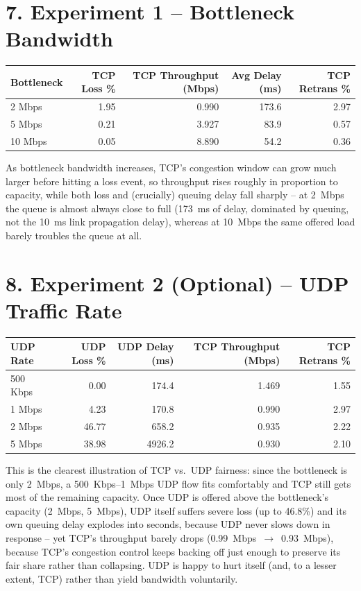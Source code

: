 \documentclass[11pt]{article}
\begin{document}
\section*{7. Experiment 1 -- Bottleneck Bandwidth}
\begin{center}
\renewcommand{\arraystretch}{1.2}
\begin{tabular}{lrrrr}
\toprule
\textbf{Bottleneck} & \textbf{TCP Loss \%} & \textbf{TCP Throughput (Mbps)} & \textbf{Avg Delay (ms)} & \textbf{TCP Retrans \%} \\
\midrule
2 Mbps  & 1.95 & 0.990 & 173.6 & 2.97 \\
5 Mbps  & 0.21 & 3.927 & 83.9  & 0.57 \\
10 Mbps & 0.05 & 8.890 & 54.2  & 0.36 \\
\bottomrule
\end{tabular}
\end{center}
As bottleneck bandwidth increases, TCP's congestion window can grow much
larger before hitting a loss event, so throughput rises roughly in
proportion to capacity, while both loss and (crucially) queuing delay fall
sharply -- at 2~Mbps the queue is almost always close to full (173~ms of
delay, dominated by queuing, not the 10~ms link propagation delay), whereas
at 10~Mbps the same offered load barely troubles the queue at all.

\section*{8. Experiment 2 (Optional) -- UDP Traffic Rate}
\begin{center}
\renewcommand{\arraystretch}{1.2}
\begin{tabular}{lrrrr}
\toprule
\textbf{UDP Rate} & \textbf{UDP Loss \%} & \textbf{UDP Delay (ms)} & \textbf{TCP Throughput (Mbps)} & \textbf{TCP Retrans \%} \\
\midrule
500 Kbps & 0.00  & 174.4  & 1.469 & 1.55 \\
1 Mbps   & 4.23  & 170.8  & 0.990 & 2.97 \\
2 Mbps   & 46.77 & 658.2  & 0.935 & 2.22 \\
5 Mbps   & 38.98 & 4926.2 & 0.930 & 2.10 \\
\bottomrule
\end{tabular}
\end{center}
This is the clearest illustration of TCP vs.\ UDP fairness: since the
bottleneck is only 2~Mbps, a 500~Kbps--1~Mbps UDP flow fits comfortably and
TCP still gets most of the remaining capacity. Once UDP is offered above the
bottleneck's capacity (2~Mbps, 5~Mbps), UDP itself suffers severe loss
(up to 46.8\%) and its own queuing delay explodes into seconds, because UDP
never slows down in response -- yet TCP's throughput barely drops
(0.99~Mbps~$\to$~0.93~Mbps), because TCP's congestion control keeps
backing off just enough to preserve its fair share rather than collapsing.
UDP is happy to hurt itself (and, to a lesser extent, TCP) rather than yield
bandwidth voluntarily.
\end{document}
